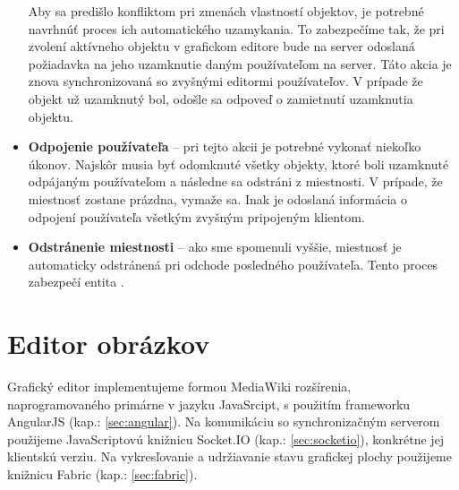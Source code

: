 \begin{itemize}
	Aby sa predišlo konfliktom pri zmenách vlastností objektov, je potrebné navrhnúť proces ich automatického uzamykania. To zabezpečíme tak, že pri zvolení aktívneho objektu v grafickom editore bude na server odoslaná požiadavka na jeho uzamknutie daným používateľom na server. Táto akcia je znova synchronizovaná so zvyšnými editormi používateľov. V prípade že objekt už uzamknutý bol, odošle sa odpoveď o zamietnutí uzamknutia objektu.
	
	\item \textbf{Odpojenie používateľa} -- pri tejto akcii je potrebné vykonať niekoľko úkonov. Najskôr musia byť odomknuté všetky objekty, ktoré boli uzamknuté odpájaným používateľom a následne sa odstráni z miestnosti. V prípade, že miestnosť zostane prázdna, vymaže sa. Inak je odoslaná informácia o odpojení používateľa všetkým zvyšným pripojeným klientom.
	
	\item \textbf{Odstránenie miestnosti} -- ako sme spomenuli vyššie, miestnosť je automaticky odstránená pri odchode posledného používateľa. Tento proces zabezpečí entita .
	
\end{itemize}

\section{Editor obrázkov}
Grafický editor implementujeme formou MediaWiki rozšírenia, naprogramovaného primárne v jazyku JavaSrcipt, s použitím frameworku AngularJS (kap.: \ref{sec:angular}). Na komunikáciu so synchronizačným serverom použijeme JavaScriptovú knižnicu Socket.IO (kap.: \ref{sec:socketio}), konkrétne jej klientskú verziu. Na vykresľovanie a udržiavanie stavu grafickej plochy použijeme knižnicu Fabric (kap.: \ref{sec:fabric}). 

